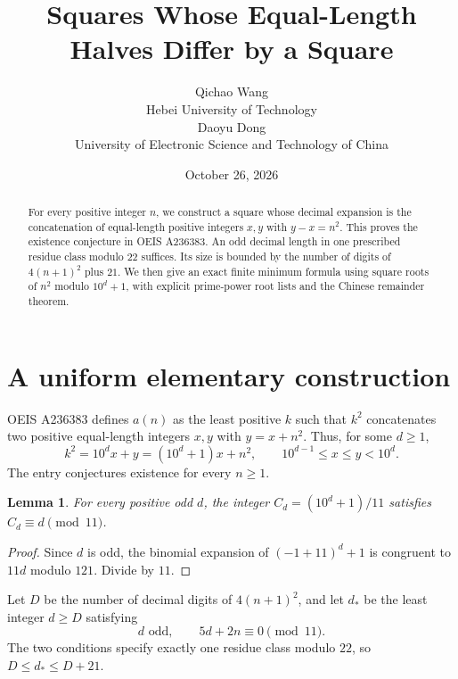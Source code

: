 \documentclass[10pt]{article}
\title{Squares Whose Equal-Length Halves Differ by a Square}
\author{Qichao Wang\\{\small Hebei University of Technology}\\[0.3em]
Daoyu Dong\\{\small University of Electronic Science and Technology of China}}
\date{October 26, 2026}
\newtheorem{lemma}{Lemma}
\begin{document}
\maketitle
\begin{abstract}
For every positive integer $n$, we construct a square whose decimal
expansion is the concatenation of equal-length positive integers
$x,y$ with $y-x=n^2$. This proves the existence conjecture in OEIS
A236383. An odd decimal length in one prescribed residue class
modulo $22$ suffices. Its size is bounded by the number of digits
of $4(n+1)^2$ plus $21$. We then give an exact finite minimum
formula using square roots of $n^2$ modulo $10^d+1$, with explicit
prime-power root lists and the Chinese remainder theorem.
\end{abstract}

\section{A uniform elementary construction}
OEIS A236383 \cite{oeis} defines $a(n)$ as the least positive $k$
such that $k^2$ concatenates two positive equal-length integers
$x,y$ with $y=x+n^2$. Thus, for some $d\ge1$,
\begin{equation}\label{eq:def}
 k^2=10^d x+y=(10^d+1)x+n^2,\qquad
 10^{d-1}\le x\le y<10^d.
\end{equation}
The entry conjectures existence for every $n\ge1$.

\begin{lemma}\label{lem:eleven}
For every positive odd $d$, the integer
$C_d=(10^d+1)/11$ satisfies $C_d\equiv d\pmod{11}$.
\end{lemma}
\begin{proof}
Since $d$ is odd, the binomial expansion of $(-1+11)^d+1$
is congruent to $11d$ modulo $121$. Divide by $11$.
\end{proof}

Let $D$ be the number of decimal digits of $4(n+1)^2$, and let
$d_*$ be the least integer $d\ge D$ satisfying
\begin{equation}\label{eq:length}
 d\text{ odd},\qquad 5d+2n\equiv0\pmod{11}.
\end{equation}
The two conditions specify exactly one residue class modulo $22$,
so $D\le d_*\le D+21$.
\end{document}
